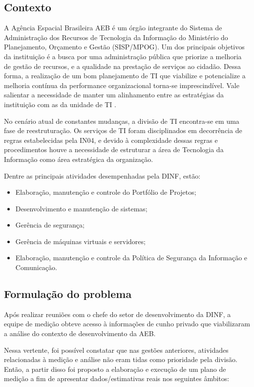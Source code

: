 \subsection{Contexto}
	A Agência Espacial Brasileira \gls{AEB} é um órgão integrante do Sistema de Administração dos Recursos de Tecnologia da Informação do Ministério do Planejamento, Orçamento e Gestão (SISP/MPOG). Um dos principais objetivos da instituição é a busca por uma administração pública que priorize a melhoria de gestão de recursos, e a qualidade na prestação de serviços ao cidadão. Dessa forma, a realização de um bom planejamento de TI que viabilize e potencialize a melhoria contínua da performance organizacional torna-se imprescindível. Vale salientar a necessidade de manter um alinhamento entre as estratégias da instituição com as da unidade de TI \cite{PDTI}.

	No cenário atual de constantes mudanças, a divisão de TI encontra-se em uma fase de reestruturação. Os serviços de TI foram disciplinados em decorrência de regras estabelecidas pela IN04, e devido à complexidade dessas regras e procedimentos houve a necessidade de estruturar a área de Tecnologia da Informação como área estratégica da organização.

	Dentre as principais atividades desempenhadas pela DINF, estão:

	\begin{itemize}
		\item{Elaboração, manutenção e controle do Portfólio de Projetos;}
		\item{Desenvolvimento e manutenção de sistemas;}
		\item{Gerência de segurança;}
		\item{Gerência de máquinas virtuais e servidores;}
		\item{Elaboração, manutenção e controle da Política de Segurança da Informação e Comunicação.}
	\end{itemize}

\subsection{Formulação do problema}

	Após realizar reuniões com o chefe do setor de desenvolvimento da DINF, a equipe de medição obteve acesso à informações de cunho privado que viabilizaram a análise do contexto de desenvolvimento da AEB.

	Nessa vertente, foi possível constatar que nas gestões anteriores, atividades relacionadas à medição e análise não eram tidas como prioridade pela divisão. Então, a partir disso foi proposto a elaboração e execução de um plano de medição a fim de apresentar dados/estimativas reais nos seguintes âmbitos:

